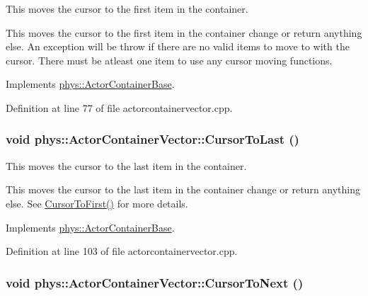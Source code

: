 This moves the cursor to the first item in the container. 

This moves the cursor to the first item in the container change or return anything else. An exception will be throw if there are no valid items to move to with the cursor. There must be atleast one item to use any cursor moving functions. 

Implements \hyperlink{classphys_1_1ActorContainerBase_ab1a44758d7c17e70ff2e0f8de47424c3}{phys::ActorContainerBase}.



Definition at line 77 of file actorcontainervector.cpp.

\hypertarget{classphys_1_1ActorContainerVector_aa6b08266bbb57a22c07ab50514e58db4}{
\subsubsection[{CursorToLast}]{\setlength{\rightskip}{0pt plus 5cm}void phys::ActorContainerVector::CursorToLast ()}}
\label{d3/d64/classphys_1_1ActorContainerVector_aa6b08266bbb57a22c07ab50514e58db4}


This moves the cursor to the last item in the container. 

This moves the cursor to the last item in the container change or return anything else. See \hyperlink{classphys_1_1ActorContainerVector_ad9c2eb2a9405dcf687c86745afc9c031}{CursorToFirst()} for more details. 

Implements \hyperlink{classphys_1_1ActorContainerBase_afad072e018a04c190e5e5fb93b82b354}{phys::ActorContainerBase}.



Definition at line 103 of file actorcontainervector.cpp.

\hypertarget{classphys_1_1ActorContainerVector_a1c72366a6261d8e98dc0a9d2fad9f70f}{
\subsubsection[{CursorToNext}]{\setlength{\rightskip}{0pt plus 5cm}void phys::ActorContainerVector::CursorToNext ()}}
\label{d3/d64/classphys_1_1ActorContainerVector_a1c72366a6261d8e98dc0a9d2fad9f70f}


